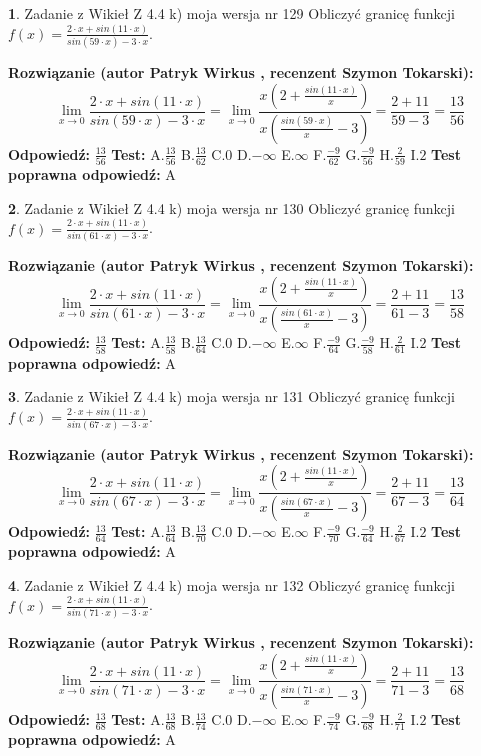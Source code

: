 \documentclass[12pt, a4paper]{article}
\theoremstyle{definition} %
\newtheorem{zad}{}
\newcommand{\zadStart}[1]{\begin{zad}#1\newline}
\newcommand{\zadStop}{\end{zad}}
\newcommand{\rozwStart}[2]{\noindent \textbf{Rozwiązanie (autor #1 , recenzent #2): }\newline}
\newcommand{\rozwStop}{\newline}
\newcommand{\odpStart}{\noindent \textbf{Odpowiedź:}\newline}
\newcommand{\odpStop}{\newline}
\newcommand{\testStart}{\noindent \textbf{Test:}\newline}
\newcommand{\testStop}{\newline}
\newcommand{\kluczStart}{\noindent \textbf{Test poprawna odpowiedź:}\newline}
\newcommand{\kluczStop}{\newline}
\begin{document}
\zadStart{Zadanie z Wikieł Z 4.4 k) moja wersja nr 129}
Obliczyć granicę funkcji $f(x)=\frac{2\cdot x +sin(11\cdot x)}{sin(59\cdot x) -3\cdot x}$.
\zadStop
\rozwStart{Patryk Wirkus}{Szymon Tokarski}
$$\lim\limits_{x\to 0}\frac{2\cdot x +sin(11\cdot x)}{sin(59\cdot x) -3\cdot x}
=\lim\limits_{x\to 0}\frac{x(2+\frac{sin(11\cdot x)}{x})}{x(\frac{sin(59\cdot x)}{x}-3)}
=\frac{2+11}{59-3} = \frac{13}{56}$$
\rozwStop
\odpStart
$\frac{13}{56}$
\odpStop
\testStart
A.$\frac{13}{56}$
B.$\frac{13}{62}$
C.$0$
D.$-\infty$
E.$\infty$
F.$\frac{-9}{62}$
G.$\frac{-9}{56}$
H.$\frac{2}{59}$
I.$2$
\testStop
\kluczStart
A
\kluczStop



\zadStart{Zadanie z Wikieł Z 4.4 k) moja wersja nr 130}
Obliczyć granicę funkcji $f(x)=\frac{2\cdot x +sin(11\cdot x)}{sin(61\cdot x) -3\cdot x}$.
\zadStop
\rozwStart{Patryk Wirkus}{Szymon Tokarski}
$$\lim\limits_{x\to 0}\frac{2\cdot x +sin(11\cdot x)}{sin(61\cdot x) -3\cdot x}
=\lim\limits_{x\to 0}\frac{x(2+\frac{sin(11\cdot x)}{x})}{x(\frac{sin(61\cdot x)}{x}-3)}
=\frac{2+11}{61-3} = \frac{13}{58}$$
\rozwStop
\odpStart
$\frac{13}{58}$
\odpStop
\testStart
A.$\frac{13}{58}$
B.$\frac{13}{64}$
C.$0$
D.$-\infty$
E.$\infty$
F.$\frac{-9}{64}$
G.$\frac{-9}{58}$
H.$\frac{2}{61}$
I.$2$
\testStop
\kluczStart
A
\kluczStop



\zadStart{Zadanie z Wikieł Z 4.4 k) moja wersja nr 131}
Obliczyć granicę funkcji $f(x)=\frac{2\cdot x +sin(11\cdot x)}{sin(67\cdot x) -3\cdot x}$.
\zadStop
\rozwStart{Patryk Wirkus}{Szymon Tokarski}
$$\lim\limits_{x\to 0}\frac{2\cdot x +sin(11\cdot x)}{sin(67\cdot x) -3\cdot x}
=\lim\limits_{x\to 0}\frac{x(2+\frac{sin(11\cdot x)}{x})}{x(\frac{sin(67\cdot x)}{x}-3)}
=\frac{2+11}{67-3} = \frac{13}{64}$$
\rozwStop
\odpStart
$\frac{13}{64}$
\odpStop
\testStart
A.$\frac{13}{64}$
B.$\frac{13}{70}$
C.$0$
D.$-\infty$
E.$\infty$
F.$\frac{-9}{70}$
G.$\frac{-9}{64}$
H.$\frac{2}{67}$
I.$2$
\testStop
\kluczStart
A
\kluczStop



\zadStart{Zadanie z Wikieł Z 4.4 k) moja wersja nr 132}
Obliczyć granicę funkcji $f(x)=\frac{2\cdot x +sin(11\cdot x)}{sin(71\cdot x) -3\cdot x}$.
\zadStop
\rozwStart{Patryk Wirkus}{Szymon Tokarski}
$$\lim\limits_{x\to 0}\frac{2\cdot x +sin(11\cdot x)}{sin(71\cdot x) -3\cdot x}
=\lim\limits_{x\to 0}\frac{x(2+\frac{sin(11\cdot x)}{x})}{x(\frac{sin(71\cdot x)}{x}-3)}
=\frac{2+11}{71-3} = \frac{13}{68}$$
\rozwStop
\odpStart
$\frac{13}{68}$
\odpStop
\testStart
A.$\frac{13}{68}$
B.$\frac{13}{74}$
C.$0$
D.$-\infty$
E.$\infty$
F.$\frac{-9}{74}$
G.$\frac{-9}{68}$
H.$\frac{2}{71}$
I.$2$
\testStop
\kluczStart
A
\kluczStop
\end{document}
